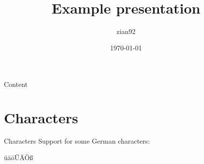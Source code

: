 \documentclass[xcolor=dvipsnames]{beamer}
\title{Example presentation}
\author{zian92}
\date{\today}
\begin{document}
	\maketitle
	
	
	\begin{frame}{Content}
		\tableofcontents	
	\end{frame}


	\section{Characters}
	\begin{frame}{Characters}
		Support for some German characters:
		
		üäöÜÄÖß
	\end{frame}
\end{document}
